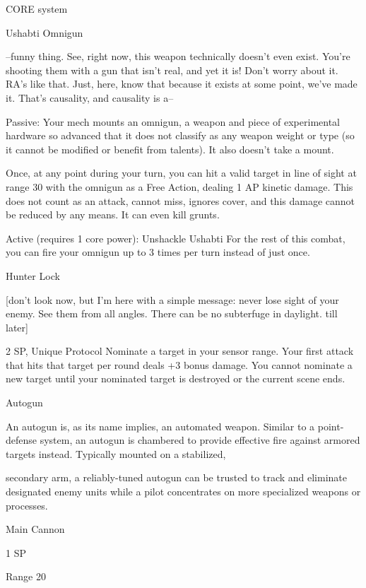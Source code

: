                                                    CORE system

                                                 Ushabti Omnigun

   --funny thing. See, right now, this weapon technically doesn’t even exist. You’re shooting them with a
  gun that isn’t real, and yet it is! Don’t worry about it.  RA’s like that. Just, here, know that because it
  exists at some point, we’ve made it. That’s causality, and causality is a--

  Passive: Your mech mounts an omnigun, a weapon and piece of experimental hardware so advanced
  that it does not classify as any weapon weight or type (so it cannot be modified or benefit from talents).
  It also doesn’t take a mount.

  Once, at any point during your turn, you can hit a valid target in line of sight at range 30 with the
  omnigun as a Free Action, dealing 1 AP kinetic damage. This does not count as an attack, cannot miss,
  ignores cover, and this damage cannot be reduced by any means. It can even kill grunts.

  Active (requires 1 core power): Unshackle Ushabti
  For the rest of this combat, you can fire your omnigun up to 3 times per turn instead of just once.

Hunter Lock

[don’t look now, but I’m here with a simple message: never lose sight of your enemy. See them from all
angles. There can be no subterfuge in daylight. till later]


2 SP, Unique
Protocol
Nominate a target in your sensor range. Your first attack that hits that target per round deals +3
bonus damage. You cannot nominate a new target until your nominated target is destroyed or
the current scene ends.





Autogun

An autogun is, as its name implies, an automated weapon. Similar to a point-defense system, an autogun is
chambered to provide effective fire against armored targets instead. Typically mounted on a stabilized,

secondary arm, a reliably-tuned autogun can be trusted to track and eliminate designated enemy units
while a pilot concentrates on more specialized weapons or processes.

Main Cannon

1 SP

Range 20

